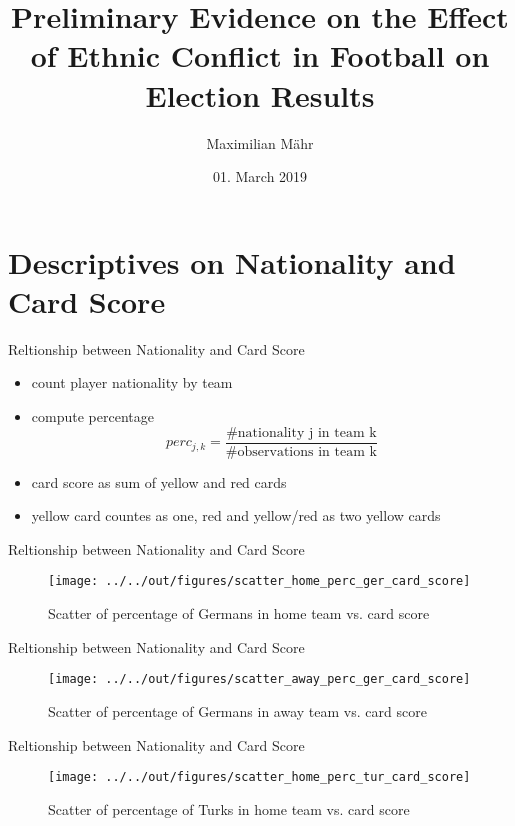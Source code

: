 \documentclass[11pt]{beamer}
\title{Preliminary Evidence on the Effect of Ethnic Conflict in Football on Election Results}
\author{Maximilian M\"ahr}
\institute{University Bonn}
\date{01. March 2019}
\begin{document}
\begin{frame}[plain]
    \titlepage
\end{frame}

\section{Descriptives on Nationality and Card Score}

\begin{frame}{Reltionship between Nationality and Card Score}
    \begin{itemize}
        \item count player nationality by team
        \item compute percentage 
        $$perc_{j, k} = \frac{\text{\# nationality j in team k}}{\text{\# observations in team k}}$$
        \item card score as sum of yellow and red cards
        \item yellow card countes as one, red and yellow/red as two yellow cards
    \end{itemize}
\end{frame}
 
\begin{frame}{Reltionship between Nationality and Card Score}
    \begin{figure}
        \caption{Scatter of percentage of Germans in home team vs. card score}
        \texttt{[image: ../../out/figures/scatter\_home\_perc\_ger\_card\_score]}
    \end{figure}
\end{frame}

\begin{frame}{Reltionship between Nationality and Card Score}
    \begin{figure}
        \caption{Scatter of percentage of Germans in away team vs. card score}
        \texttt{[image: ../../out/figures/scatter\_away\_perc\_ger\_card\_score]}
    \end{figure}
\end{frame}

\begin{frame}{Reltionship between Nationality and Card Score}
    \begin{figure}
        \caption{Scatter of percentage of Turks in home team vs. card score}
        \texttt{[image: ../../out/figures/scatter\_home\_perc\_tur\_card\_score]}
    \end{figure}
\end{frame}
\end{document}

